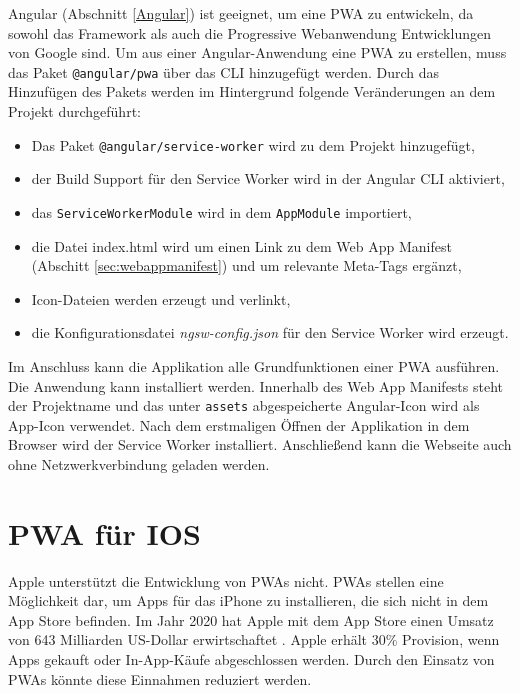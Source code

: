 Angular (Abschnitt \ref{Angular}) ist geeignet, um eine PWA zu entwickeln, da sowohl das Framework als auch die Progressive Webanwendung Entwicklungen von Google sind. 
Um aus einer Angular-Anwendung eine PWA zu erstellen, muss das Paket \texttt{@angular/pwa} über das \ac{CLI} hinzugefügt werden.
Durch das Hinzufügen des Pakets werden im Hintergrund folgende Veränderungen an dem Projekt durchgeführt: 
\begin{itemize}
    \item Das Paket \texttt{@angular/service-worker} wird zu dem Projekt hinzugefügt,
    \item der Build Support für den Service Worker wird in der Angular CLI aktiviert,
    \item das \texttt{ServiceWorkerModule} wird in dem \texttt{AppModule} importiert,
    \item die Datei index.html wird um einen Link zu dem Web App Manifest (Abschitt \ref{sec:webappmanifest}) und um relevante Meta-Tags ergänzt,
    \item Icon-Dateien werden erzeugt und verlinkt,
    \item die Konfigurationsdatei \textit{ngsw-config.json} für den Service Worker wird erzeugt. 
\end{itemize}

Im Anschluss kann die Applikation alle Grundfunktionen einer PWA ausführen. Die Anwendung kann installiert werden. Innerhalb des Web App Manifests steht der Projektname und das unter \texttt{assets} abgespeicherte Angular-Icon wird als App-Icon verwendet. Nach dem erstmaligen Öffnen der Applikation in dem Browser wird der Service Worker installiert. Anschließend kann die Webseite auch ohne Netzwerkverbindung geladen werden.  



\section{PWA für IOS}

Apple unterstützt die Entwicklung von PWAs nicht. PWAs stellen  eine Möglichkeit dar, um Apps für das iPhone zu installieren, die sich nicht in dem App Store befinden. Im Jahr 2020 hat Apple mit dem App Store einen Umsatz von 643 Milliarden US-Dollar erwirtschaftet \cite{Kirchenbauer2021}. Apple erhält 30\% Provision, wenn Apps gekauft oder In-App-Käufe abgeschlossen werden. Durch den Einsatz von PWAs könnte diese Einnahmen reduziert werden.

